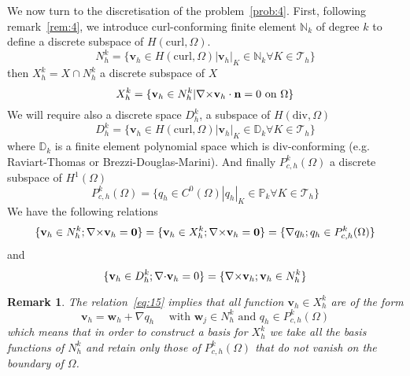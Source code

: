 \documentclass{article}
\newtheorem{remark}{Remark}
\newcommand{\Hdiv}{\ensuremath{H(\mathrm{div},\Omega)}\xspace}
\newcommand{\Hcurl}{\ensuremath{H(\mathrm{curl},\Omega)}\xspace}
\newcommand{\Pkch}{\ensuremath{P^k_{c,h}(\Omega)}\xspace}
\newcommand{\Hp}[1][1]{\ensuremath{H^{#1}(\Omega)}\xspace}
\begin{document}
We now turn to the discretisation of the problem~\ref{prob:4}. First, following
remark~\ref{rem:4}, we introduce curl-conforming finite element $\mathbb{N}_k$
of degree $k$ to define a discrete subspace of $\Hcurl$.
\begin{equation}
  \label{eq:10}
  N^k_h = \{ \mathbf{v}_h \in \Hcurl | \mathbf{v}_h|_K \in \mathbb{N}_k \forall K
  \in \mathcal{T}_h\}
\end{equation}
then $X^k_h = X \cap N^k_h$ a discrete subspace of $X$
\begin{equation}
  \label{eq:11}
  X^k_h = \{ \mathbf{v}_h \in N^k_h | {\nabla\times} \mathbf{v}_h \cdot \mathbf{n} = 0  \mbox{ on } \Omega \}
\end{equation}
We will require also a discrete space $D^k_h$, a subspace of $\Hdiv$
\begin{equation}
  \label{eq:14}
  D^k_h = \{ \mathbf{v}_h \in \Hcurl | \mathbf{v}_h|_K \in \mathbb{D}_k \forall K
  \in \mathcal{T}_h\}
\end{equation}
where $\mathbb{D}_k$ is a finite element polynomial space which is
div-conforming (e.g. Raviart-Thomas or Brezzi-Douglas-Marini).
And finally $\Pkch$ a discrete subspace of $\Hp$
\begin{equation}
  \label{eq:12}
  \Pkch = \{ q_h \in C^0(\Omega) | q_h|_K \in \mathbb{P}_k \forall K \in \mathcal{T}_h\}
\end{equation}
We have the following relations
\begin{equation}
  \label{eq:13}
  \{\mathbf{v}_h \in N^k_h; \curl \mathbf{v}_h = \mathbf{0} \} = \{\mathbf{v}_h
  \in X^k_h; \curl \mathbf{v}_h = \mathbf{0} \} = \{\nabla q_h; q_h \in \Pkch\}
\end{equation}
and
\begin{equation}
  \label{eq:15}
  \{\mathbf{v}_h \in D^k_h; {\nabla\cdot} \mathbf{v}_h = 0 \} = \{{\nabla\times} \mathbf{v}_h;
  \mathbf{v}_h \in N^k_h \}
\end{equation}
\begin{remark}
  \label{rem:5}
  The relation~\eqref{eq:15} implies that all function $\mathbf{v}_h \in X^k_h$
  are of the form
  \begin{equation}
    \label{eq:16}
    \mathbf{v}_h = \mathbf{w}_h + \nabla q_h\quad \mbox{ with } \mathbf{w}_j \in
    N^k_h \mbox{ and } q_h \in \Pkch
  \end{equation}
  which means that in order to construct a basis for $X^k_h$ we take all the
  basis functions of $N^k_h$ and retain only those of $\Pkch$ that do not vanish
  on the boundary of $\Omega$.
\end{remark}
\end{document}

